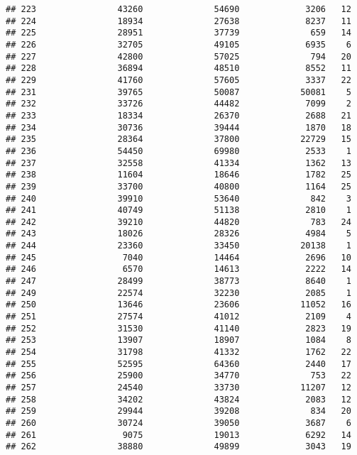 \documentclass[
]{article}
\begin{document}
\begin{verbatim}
## 223                43260              54690             3206   12
## 224                18934              27638             8237   11
## 225                28951              37739              659   14
## 226                32705              49105             6935    6
## 227                42800              57025              794   20
## 228                36894              48510             8552   11
## 229                41760              57605             3337   22
## 231                39765              50087            50081    5
## 232                33726              44482             7099    2
## 233                18334              26370             2688   21
## 234                30736              39444             1870   18
## 235                28364              37800            22729   15
## 236                54450              69980             2533    1
## 237                32558              41334             1362   13
## 238                11604              18646             1782   25
## 239                33700              40800             1164   25
## 240                39910              53640              842    3
## 241                40749              51138             2810    1
## 242                39210              44820              783   24
## 243                18026              28326             4984    5
## 244                23360              33450            20138    1
## 245                 7040              14464             2696   10
## 246                 6570              14613             2222   14
## 247                28499              38773             8640    1
## 249                22574              32230             2085    1
## 250                13646              23606            11052   16
## 251                27574              41012             2109    4
## 252                31530              41140             2823   19
## 253                13907              18907             1084    8
## 254                31798              41332             1762   22
## 255                52595              64360             2440   17
## 256                25900              34770              753   22
## 257                24540              33730            11207   12
## 258                34202              43824             2083   12
## 259                29944              39208              834   20
## 260                30724              39050             3687    6
## 261                 9075              19013             6292   14
## 262                38880              49899             3043   19

\end{verbatim}
\end{document}
